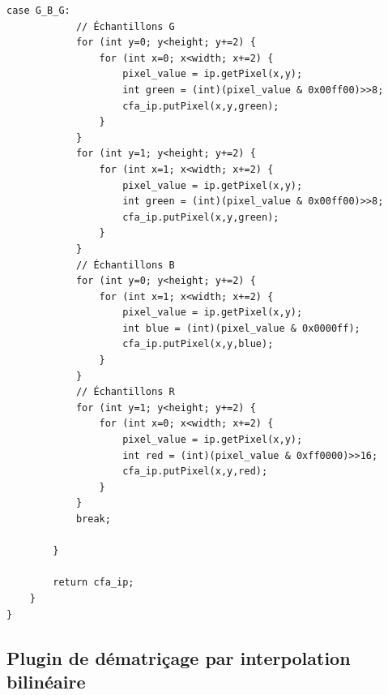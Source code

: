 \documentclass[a4paper,11pt]{article}
\begin{document}
\begin{lstlisting}[caption=Code du premier exercie]
		case G_B_G:
			// Échantillons G
			for (int y=0; y<height; y+=2) {
				for (int x=0; x<width; x+=2) {
					pixel_value = ip.getPixel(x,y);
					int green = (int)(pixel_value & 0x00ff00)>>8;
					cfa_ip.putPixel(x,y,green);
				}
			}
			for (int y=1; y<height; y+=2) {
				for (int x=1; x<width; x+=2) {
					pixel_value = ip.getPixel(x,y);
					int green = (int)(pixel_value & 0x00ff00)>>8;
					cfa_ip.putPixel(x,y,green);
				}
			}
			// Échantillons B
			for (int y=0; y<height; y+=2) {
				for (int x=1; x<width; x+=2) {
					pixel_value = ip.getPixel(x,y);
					int blue = (int)(pixel_value & 0x0000ff);
					cfa_ip.putPixel(x,y,blue);
				}
			}
			// Échantillons R
			for (int y=1; y<height; y+=2) {
				for (int x=0; x<width; x+=2) {
					pixel_value = ip.getPixel(x,y);
					int red = (int)(pixel_value & 0xff0000)>>16;
					cfa_ip.putPixel(x,y,red);
				}
			}
			break;
			
		}

		return cfa_ip;
	}
}
  \end{lstlisting}

  \subsection{Plugin de dématriçage par interpolation bilinéaire}
  
\end{document}
